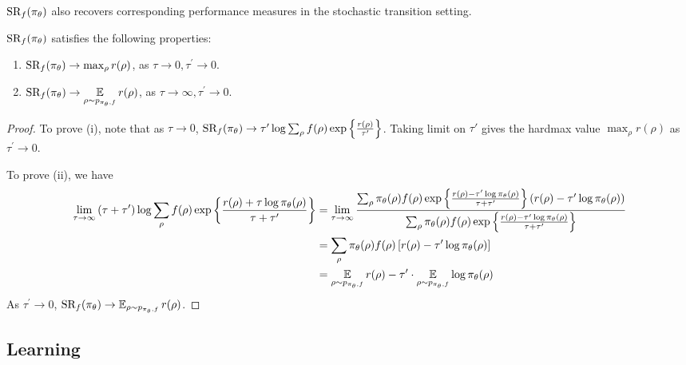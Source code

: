 $\text{SR}_f(\pi_\theta)$ also recovers corresponding performance measures in the stochastic transition setting.
\begin{prop}
\label{prop:sr_stochastic}
$\text{SR}_f(\pi_\theta)$ satisfies the following properties:
\begin{enumerate}[label=(\roman*)]
	\item  $\text{SR}_f(\pi_\theta) \to \max_{\rho}{r(\rho)}$, as $\tau \to 0, \tau^{\prime} \to 0$.
	\item $\text{SR}_f(\pi_\theta) \to \operatorname*{\mathbb{E}}\limits_{\rho \sim p_{\pi_\theta, f}}{r(\rho)}$, as $\tau \to \infty, \tau^{\prime} \to 0$. 
\end{enumerate}	
\end{prop}
\begin{proof}
To prove (i), note that as $\tau \to 0$, $\text{SR}_f(\pi_\theta) \to \tau^{\prime} \log{ \sum_{\rho}{ f(\rho) \exp\left\{ \frac{r(\rho) }{ \tau^{\prime} } \right\} }}$. Taking limit on $\tau'$ gives the hardmax value $\max_{\rho}{r(\rho)}$ as $\tau^{\prime} \to 0$.
	
To prove (ii), we have 
\begin{align*}
	\lim\limits_{\tau \to \infty}{ (\tau + \tau^{\prime})\log{ \sum_{\rho}{ f(\rho) \exp\left\{ \frac{r(\rho) + \tau \log{\pi_\theta(\rho)} }{\tau + \tau^{\prime}} \right\} }} } &= \lim\limits_{\tau \to \infty}{ \frac{ \sum_{\rho}{ \pi_\theta(\rho) f(\rho) \exp\left\{ \frac{r(\rho) - \tau^{\prime} \log{\pi_\theta(\rho)} }{\tau + \tau^{\prime}} \right\} \left( r(\rho) - \tau^{\prime}\log{\pi_\theta(\rho)} \right) } }{  \sum_{\rho}{ \pi_\theta(\rho) f(\rho) \exp\left\{ \frac{r(\rho) - \tau^{\prime} \log{\pi_\theta(\rho)} }{\tau + \tau^{\prime}} \right\} } } } \\
	&= \sum_{\rho}{ \pi_\theta(\rho) f(\rho) \left[ r(\rho) - \tau^{\prime}\log{\pi_\theta(\rho)} \right] } \\
	&= \operatorname*{\mathbb{E}}\limits_{\rho \sim p_{\pi_\theta, f}}{r(\rho)} -  \tau^{\prime} \cdot \operatorname*{\mathbb{E}}\limits_{\rho \sim p_{\pi_\theta, f}}{  \log{\pi_\theta(\rho)} }
\end{align*}
As $\tau^{\prime} \to 0$, $\text{SR}_f(\pi_\theta) \to \operatorname*{\mathbb{E}}_{\rho \sim p_{\pi_\theta, f}}{r(\rho)}$.
\end{proof}

\subsection{Learning}

